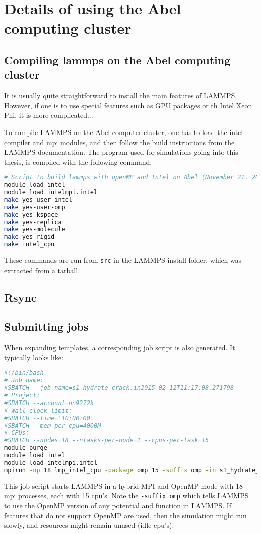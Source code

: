 \chapter{Details of using the Abel computing cluster}

\section{Compiling lammps on the Abel computing cluster}
It is usually quite straightforward to install the main features of LAMMPS. However, if one is to use special features such as GPU packages or th Intel Xeon Phi, it is more complicated... 	

To compile LAMMPS on the Abel computer cluster, one has to load the intel compiler and mpi modules, and then follow the build instructions from the LAMMPS documentation. The program used for simulations going into this thesis, is compiled with the following command:
\begin{lstlisting}[language=Bash]
# Script to build lammps with openMP and Intel on Abel (November 21. 2014)
module load intel
module load intelmpi.intel
make yes-user-intel
make yes-user-omp
make yes-kspace
make yes-replica
make yes-molecule
make yes-rigid
make intel_cpu
\end{lstlisting}
These commands are run from {\tt src} in the LAMMPS install folder, which was extracted from a tarball.

\section{Rsync}

\section{Submitting jobs}
When expanding templates, a corresponding job script is also generated. It typically looks like:
\begin{lstlisting}[language=Bash]
#!/bin/bash
# Job name:
#SBATCH --job-name=s1_hydrate_crack.in2015-02-12T11:17:08.271798
# Project: 
#SBATCH --account=nn9272k
# Wall clock limit:
#SBATCH --time='10:00:00'
#SBATCH --mem-per-cpu=4000M
# CPUs:
#SBATCH --nodes=18 --ntasks-per-node=1 --cpus-per-task=15
module purge
module load intel
module load intelmpi.intel
mpirun -np 18 lmp_intel_cpu -package omp 15 -suffix omp -in s1_hydrate_crack.in
\end{lstlisting}

This job script starts LAMMPS in a hybrid MPI and OpenMP mode with 18 mpi processes, each with 15 cpu's. Note the {\tt -suffix omp} which tells LAMMPS to use the OpenMP version of any potential and function in LAMMPS. If features that do not support OpenMP are used, then the simulation might run slowly, and resources might remain unused (idle cpu's).